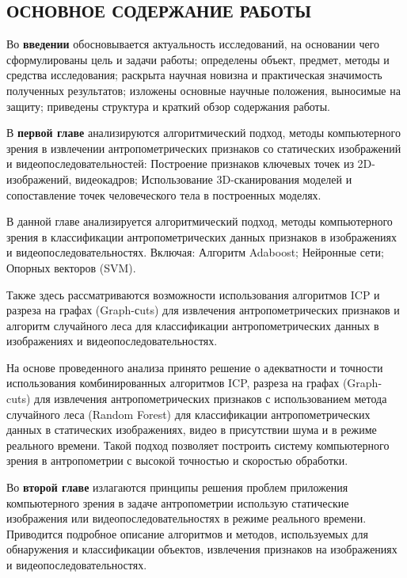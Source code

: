 
\begin{center}
\subsection*{ОСНОВНОЕ СОДЕРЖАНИЕ РАБОТЫ}
\end{center}

Во {\textbf{введении}} обосновывается актуальность исследований, на основании чего сформулированы цель и задачи работы; определены объект, предмет, методы и средства исследования; раскрыта научная новизна и практическая значимость полученных результатов; изложены основные научные положения, выносимые на защиту; приведены структура и краткий обзор содержания работы.

В \textbf {первой главе} анализируются алгоритмический подход, методы компьютерного зрения в извлечении антропометрических признаков со статических изображений и видеопоследовательностей: Построение признаков ключевых точек из 2D-изображений, видеокадров; Использование 3D-сканирования моделей и сопоставление точек человеческого тела в построенных моделях.

В данной главе анализируется алгоритмический подход, методы компьютерного зрения в классификации антропометрических данных признаков в изображениях и видеопоследовательностях. Включая: Алгоритм Adaboost; Нейронные сети; Опорных векторов (SVM).

Также здесь рассматриваются возможности использования алгоритмов ICP и разреза на графах (Graph-сuts) для извлечения антропометрических признаков и алгоритм случайного леса для классификации антропометрических данных в изображениях и видеопоследовательностях.

На основе проведенного анализа принято решение о адекватности и точности использования комбинированных алгоритмов ICP, разреза на графах (Graph-cuts) для извлечения антропометрических признаков с использованием метода случайного леса (Random Forest) для классификации антропометрических данных в статических изображениях, видео в присутствии шума и в режиме реального времени. Такой подход позволяет построить систему компьютерного зрения в антропометрии с высокой точностью и скоростью обработки.

Во \textbf{второй главе} излагаются принципы решения проблем приложения компьютерного зрения в задаче антропометрии использую статические изображения или видеопоследовательностях в режиме реального времени. Приводится подробное описание алгоритмов и методов, используемых для обнаружения и классификации объектов, извлечения признаков на изображениях и видеопоследовательностях.

